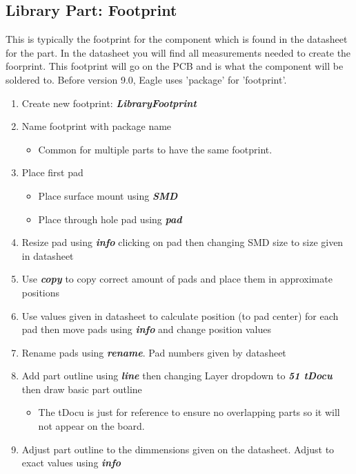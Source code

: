 \documentclass{article}
\begin{document}
\subsection{Library Part: Footprint}
This is typically the footprint for the component which is found in the datasheet for the part. In the datasheet you will find all measurements needed to create the foorprint. This footprint will go on the PCB and is what the component will be soldered to. Before version 9.0, Eagle uses 'package' for 'footprint'.  
\begin{enumerate}
    \item Create new footprint: \textit{\textbf{Library\textrightarrow Footprint}}
    \item Name footprint with package name
    \begin{itemize}
        \item Common for multiple parts to have the same footprint.
    \end{itemize}
    \item Place first pad
    \begin{itemize}
        \item Place surface mount using \textit{\textbf{SMD}}
        \item Place through hole pad using \textit{\textbf{pad}}
    \end{itemize}
    \item Resize pad using \textit{\textbf{info}} clicking on pad then changing SMD size to size given in datasheet
    \item Use \textit{\textbf{copy}} to copy correct amount of pads and place them in approximate positions
    \item Use values given in datasheet to calculate position (to pad center) for each pad then move pads using \textit{\textbf{info}} and change position values
    \item Rename pads using \textit{\textbf{rename}}. Pad numbers given by datasheet
    \item Add part outline using \textit{\textbf{line}} then changing Layer dropdown to \textit{\textbf{51 tDocu}} then draw basic part outline
    \begin{itemize}
        \item The tDocu is just for reference to ensure no overlapping parts so it will not appear on the board.
    \end{itemize}
    \item Adjust part outline to the dimmensions given on the datasheet. Adjust to exact values using \textit{\textbf{info}}

\end{enumerate}
\end{document}
